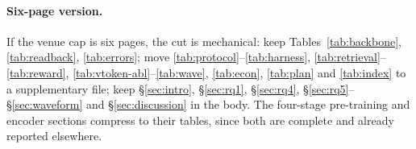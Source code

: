\paragraph{Six-page version.}
If the venue cap is six pages, the cut is mechanical: keep Tables~\ref{tab:backbone}, \ref{tab:readback}, \ref{tab:errors}; move \ref{tab:protocol}--\ref{tab:harness}, \ref{tab:retrieval}--\ref{tab:reward}, \ref{tab:vtoken-abl}--\ref{tab:wave}, \ref{tab:econ}, \ref{tab:plan} and \ref{tab:index} to a supplementary file; keep \S\ref{sec:intro}, \S\ref{sec:rq1}, \S\ref{sec:rq4}, \S\ref{sec:rq5}--\S\ref{sec:waveform} and \S\ref{sec:discussion} in the body.
The four-stage pre-training and encoder sections compress to their tables, since both are complete and already reported elsewhere.
